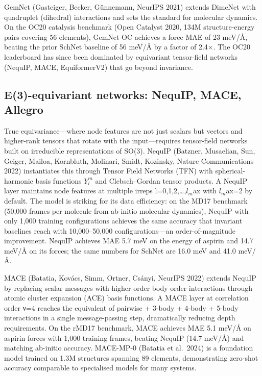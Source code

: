 GemNet (Gasteiger, Becker, Günnemann, NeurIPS 2021) extends DimeNet with quadruplet (dihedral) interactions and sets the standard for molecular dynamics. On the OC20 catalysis benchmark (Open Catalyst 2020, 134M structure-energy pairs covering 56 elements), GemNet-OC achieves a force MAE of 23 meV/Å, beating the prior SchNet baseline of 56 meV/Å by a factor of 2.4×. The OC20 leaderboard has since been dominated by equivariant tensor-field networks (NequIP, MACE, EquiformerV2) that go beyond invariance.

\subsection{E(3)-equivariant networks: NequIP, MACE, Allegro}\label{e3-equivariant-networks-nequip-mace-allegro}

True equivariance---where node features are not just scalars but vectors and higher-rank tensors that rotate with the input---requires tensor-field networks built on irreducible representations of SO(3). NequIP (Batzner, Musaelian, Sun, Geiger, Mailoa, Kornbluth, Molinari, Smidt, Kozinsky, Nature Communications 2022) instantiates this through Tensor Field Networks (TFN) with spherical-harmonic basis functions \(Y_l^m\) and Clebsch--Gordan tensor products. A NequIP layer maintains node features at multiple irreps l=0,1,2,\ldots,\(l_m\)ax with \(l_m\)ax=2 by default. The model is striking for its data efficiency: on the MD17 benchmark (50,000 frames per molecule from ab-initio molecular dynamics), NequIP with only 1,000 training configurations achieves the same accuracy that invariant baselines reach with 10,000--50,000 configurations---an order-of-magnitude improvement. NequIP achieves MAE 5.7 meV on the energy of aspirin and 14.7 meV/Å on its forces; the same numbers for SchNet are 16.0 meV and 41.0 meV/Å.

MACE (Batatia, Kovács, Simm, Ortner, Csányi, NeurIPS 2022) extends NequIP by replacing scalar messages with higher-order body-order interactions through atomic cluster expansion (ACE) basis functions. A MACE layer at correlation order ν=4 reaches the equivalent of pairwise + 3-body + 4-body + 5-body interactions in a single message-passing step, dramatically reducing depth requirements. On the rMD17 benchmark, MACE achieves MAE 5.1 meV/Å on aspirin forces with 1,000 training frames, beating NequIP (14.7 meV/Å) and matching ab-initio accuracy. MACE-MP-0 (Batatia et al.~2024) is a foundation model trained on 1.3M structures spanning 89 elements, demonstrating zero-shot accuracy comparable to specialised models for many systems.

